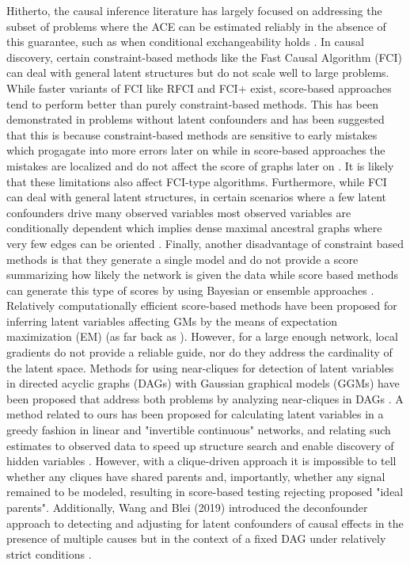 \documentclass[letterpaper]{article}
\begin{document}
Hitherto, the causal inference literature has largely focused on addressing the subset of problems where the ACE can be estimated reliably in the absence of this guarantee, such as when conditional exchangeability holds \cite{hernan_estimating_2006}.  In causal discovery, certain constraint-based methods like the Fast
Causal Algorithm (FCI) \cite{spirtesCausalInferencePresence1995} can
deal with general latent structures but do not scale well to large
problems. While faster variants of FCI like RFCI \cite{colombo_learning_2012}
and  FCI+ \cite{claassenLearningSparseCausal2013} exist, score-based
approaches tend to perform better than purely constraint-based methods. This
has been demonstrated in problems without latent confounders
\cite{nandy2018high} and has been suggested that this is because
constraint-based methods are sensitive to early mistakes which
progagate into more errors later on while in score-based approaches
the mistakes are localized and do not affect the score of graphs later
on \cite{bernstein2020ordering}. It is likely that these limitations also
affect FCI-type algorithms. Furthermore, while FCI can deal with
general latent structures, in certain scenarios where a few latent confounders
drive  many observed variables  most observed variables are
conditionally dependent which implies dense maximal ancestral graphs
where very few edges can be oriented
\cite{frotRobustCausalStructure2017}. Finally, another disadvantage of
constraint based methods is that they generate a single model and do
not provide a score summarizing how likely the network is given the
data while score based methods can generate this type of scores by using Bayesian or ensemble approaches \cite{jabbariDiscoveryCausalModels2017}. Relatively computationally efficient score-based methods have been proposed for inferring latent variables affecting GMs by the means of expectation maximization (EM) (as far back as \cite{friedman1997learning,friedman1998bayesian}).  However, for a large enough network, local gradients do not provide a reliable guide, nor do they address the cardinality of the latent space.  Methods for using near-cliques for detection of latent variables in directed acyclic graphs (DAGs) with Gaussian graphical models (GGMs) have been proposed that address both problems by analyzing near-cliques in DAGs \cite{elidan_discovering_2001,silva_learning_2006}.  A method related to ours has been proposed for calculating latent variables in a greedy fashion in linear and "invertible continuous" networks, and relating such estimates to observed data to speed up structure search and enable discovery of hidden variables \cite{elidan_ideal_2007}. However, with a clique-driven approach it is impossible to tell whether any cliques have shared parents and, importantly, whether any signal remained to be modeled, resulting in score-based testing rejecting proposed "ideal parents". Additionally, Wang and Blei (2019) introduced the deconfounder approach to detecting and adjusting for latent confounders of causal effects in the presence of multiple causes but in the context of a fixed DAG under relatively strict conditions \cite{wang_deconfounder_2019,wangMultipleCausesCausal2019}. 
\end{document}
